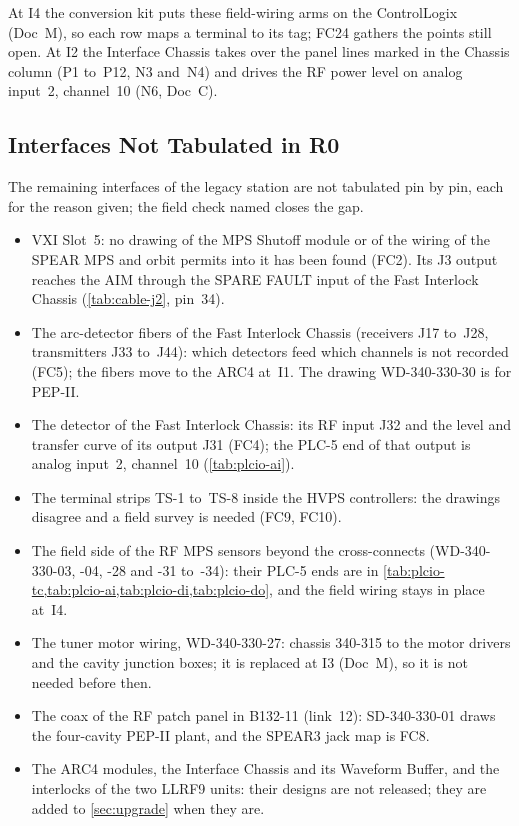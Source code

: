 At I4 the conversion kit puts these field-wiring arms on the ControlLogix (Doc~M), so
each row maps a terminal to its tag; FC24 gathers the points still open. At I2 the
Interface Chassis takes over the panel lines marked in the Chassis column (P1 to~P12,
N3 and~N4) and drives the RF power level on analog input~2, channel~10 (N6, Doc~C).







\subsection{Interfaces Not Tabulated in R0}\label{sec:coverage}

The remaining interfaces of the legacy station are not tabulated pin by pin, each for
the reason given; the field check named closes the gap.
\begin{itemize}
\item VXI Slot~5: no drawing of the MPS Shutoff module or of the wiring of the SPEAR
  MPS and orbit permits into it has been found (FC2). Its J3 output reaches the AIM
  through the SPARE FAULT input of the Fast Interlock Chassis (\cref{tab:cable-j2},
  pin~34).
\item The arc-detector fibers of the Fast Interlock Chassis (receivers J17 to~J28,
  transmitters J33 to~J44): which detectors feed which channels is not recorded
  (FC5); the fibers move to the ARC4 at~I1. The drawing WD-340-330-30 is for PEP-II.
\item The detector of the Fast Interlock Chassis: its RF input J32 and the level and
  transfer curve of its output J31 (FC4); the PLC-5 end of that output is analog
  input~2, channel~10 (\cref{tab:plcio-ai}).
\item The terminal strips TS-1 to~TS-8 inside the HVPS controllers: the drawings
  disagree and a field survey is needed (FC9, FC10).
\item The field side of the RF MPS sensors beyond the cross-connects (WD-340-330-03,
  -04, -28 and -31 to~-34): their PLC-5 ends are in
  \cref{tab:plcio-tc,tab:plcio-ai,tab:plcio-di,tab:plcio-do}, and the field wiring
  stays in place at~I4.
\item The tuner motor wiring, WD-340-330-27: chassis 340-315 to the motor drivers and
  the cavity junction boxes; it is replaced at I3 (Doc~M), so it is not needed before
  then.
\item The coax of the RF patch panel in B132-11 (link~12): SD-340-330-01 draws the
  four-cavity PEP-II plant, and the SPEAR3 jack map is FC8.
\item The ARC4 modules, the Interface Chassis and its Waveform Buffer, and the
  interlocks of the two LLRF9 units: their designs are not released; they are added
  to \cref{sec:upgrade} when they are.
\end{itemize}

